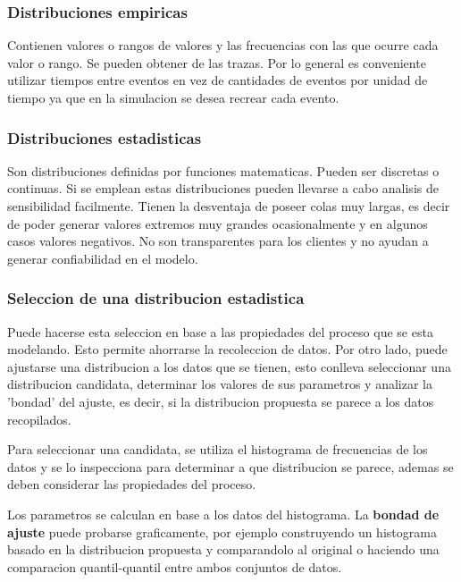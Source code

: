 \documentclass[a4paper]{article}
\begin{document}
\subsubsection*{Distribuciones empiricas}
Contienen valores o rangos de valores y las frecuencias con las que ocurre cada valor o rango.
Se pueden obtener de las trazas.
Por lo general es conveniente utilizar tiempos entre eventos en vez de cantidades de eventos por
unidad de tiempo ya que en la simulacion se desea recrear cada evento.

\subsubsection*{Distribuciones estadisticas}
Son distribuciones definidas por funciones matematicas. Pueden ser discretas o continuas.
Si se emplean estas distribuciones pueden llevarse a cabo analisis de sensibilidad 
facilmente. Tienen la desventaja de poseer colas muy largas, es decir de poder generar
valores extremos muy grandes ocasionalmente y en algunos casos valores negativos.
No son transparentes para los clientes y no ayudan a generar confiabilidad en el modelo.

\subsubsection*{Seleccion de una distribucion estadistica}
Puede hacerse esta seleccion en base a las propiedades del proceso que se esta modelando.
Esto permite ahorrarse la recoleccion de datos.
Por otro lado, puede ajustarse una distribucion a los datos que se tienen, esto conlleva 
seleccionar una distribucion candidata, determinar los valores de sus parametros y analizar
la 'bondad' del ajuste, es decir, si la distribucion propuesta se parece a los datos recopilados.

Para seleccionar una candidata, se utiliza el histograma de frecuencias de los datos y se lo 
inspecciona para determinar a que distribucion se parece, ademas se deben considerar las propiedades 
del proceso.

Los parametros se calculan en base a los datos del histograma. %
La \textbf{bondad de ajuste} puede probarse graficamente, por ejemplo construyendo un histograma basado en la
distribucion propuesta y comparandolo al original o haciendo una comparacion quantil-quantil entre ambos
conjuntos de datos.
\end{document}
